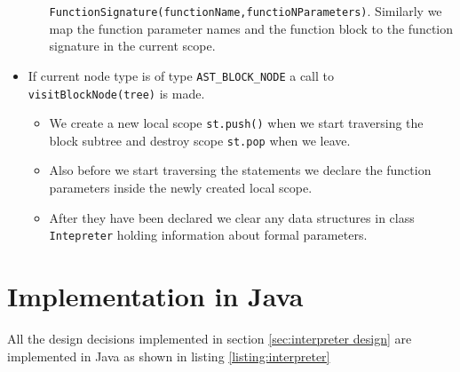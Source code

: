 \begin{itemize}
\begin{itemize}
	      	      \verb!FunctionSignature(functionName,functioNParameters)!. Similarly we map the function parameter names and the function block to the function signature in the current scope.
	      \end{itemize}
	\item If current node type is of type \verb!AST_BLOCK_NODE! a call to \verb!visitBlockNode(tree)! is made.
	      \begin{itemize}
	      	\item We create a new local scope \verb!st.push()! when we start traversing the block subtree and destroy scope \verb!st.pop! when we leave.
	      	\item Also before we start traversing the statements we declare the function parameters inside the newly created local scope.
	      	\item After they have been declared we clear any data structures in class \verb!Intepreter! holding information about formal parameters.
	      \end{itemize}
\end{itemize}

\section{Implementation in Java}
All the design decisions implemented in section \ref{sec:interpreter design} are implemented in Java as shown in listing \ref{listing:interpreter}

